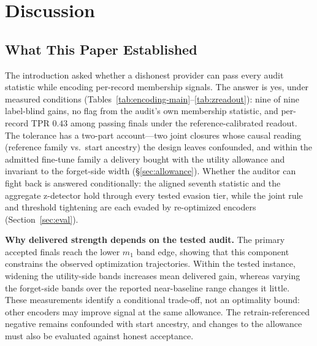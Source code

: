 \documentclass[lettersize,journal]{IEEEtran}
\begin{document}
\section{Discussion}\label{sec:discussion}

\subsection{What This Paper Established}
The introduction asked whether a dishonest provider can pass
every audit statistic while encoding per-record membership
signals. The answer is yes, under measured conditions
(Tables~\ref{tab:encoding-main}--\ref{tab:zreadout}): nine
of nine label-blind gains, no flag from the audit's own
membership statistic, and per-record TPR $0.43$ among
passing finals under the reference-calibrated readout. The
tolerance has a two-part
account---two joint closures whose causal reading (reference
family vs.\ start ancestry) the design leaves confounded, and
within the admitted fine-tune family a delivery bought with
the utility allowance and invariant to the forget-side width
(\S\ref{sec:allowance}). Whether
the auditor can fight back is answered conditionally: the
aligned seventh statistic and the aggregate z-detector hold
through every tested evasion tier, while the joint rule and
threshold tightening are each evaded by re-optimized encoders
(Section~\ref{sec:eval}).

\textbf{Why delivered strength depends on the tested audit.}
The primary accepted finals reach the lower $m_1$ band edge,
showing that this component constrains the observed
optimization trajectories. Within the tested instance,
widening the utility-side bands increases mean delivered
gain, whereas varying the forget-side bands over the
reported near-baseline range changes it little. These
measurements identify a conditional trade-off, not an
optimality bound: other encoders may improve signal at the
same allowance. The retrain-referenced negative remains
confounded with start ancestry, and changes to the allowance
must also be evaluated against honest acceptance.
\end{document}
